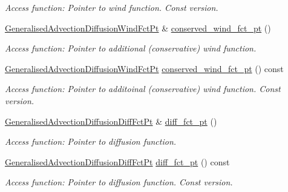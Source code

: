 \begin{DoxyCompactItemize}
\begin{DoxyCompactList}\small\item\em Access function\+: Pointer to wind function. Const version. \end{DoxyCompactList}\item 
\hyperlink{classoomph_1_1GeneralisedAdvectionDiffusionEquations_ac5a63eb03aee5957e7b14a4578423cfc}{Generalised\+Advection\+Diffusion\+Wind\+Fct\+Pt} \& \hyperlink{classoomph_1_1GeneralisedAdvectionDiffusionEquations_ad30d41db43db57884cac9a0223715b50}{conserved\+\_\+wind\+\_\+fct\+\_\+pt} ()
\begin{DoxyCompactList}\small\item\em Access function\+: Pointer to additional (conservative) wind function. \end{DoxyCompactList}\item 
\hyperlink{classoomph_1_1GeneralisedAdvectionDiffusionEquations_ac5a63eb03aee5957e7b14a4578423cfc}{Generalised\+Advection\+Diffusion\+Wind\+Fct\+Pt} \hyperlink{classoomph_1_1GeneralisedAdvectionDiffusionEquations_a94a89a5a56af79c7924af36e2adc0038}{conserved\+\_\+wind\+\_\+fct\+\_\+pt} () const
\begin{DoxyCompactList}\small\item\em Access function\+: Pointer to additoinal (conservative) wind function. Const version. \end{DoxyCompactList}\item 
\hyperlink{classoomph_1_1GeneralisedAdvectionDiffusionEquations_a637371a9eebc399023c6a652e8219263}{Generalised\+Advection\+Diffusion\+Diff\+Fct\+Pt} \& \hyperlink{classoomph_1_1GeneralisedAdvectionDiffusionEquations_aa0d22a83b060ea55524c198f7be2c73c}{diff\+\_\+fct\+\_\+pt} ()
\begin{DoxyCompactList}\small\item\em Access function\+: Pointer to diffusion function. \end{DoxyCompactList}\item 
\hyperlink{classoomph_1_1GeneralisedAdvectionDiffusionEquations_a637371a9eebc399023c6a652e8219263}{Generalised\+Advection\+Diffusion\+Diff\+Fct\+Pt} \hyperlink{classoomph_1_1GeneralisedAdvectionDiffusionEquations_a7e2bcd1880f2e58986c230aea5fa0e0a}{diff\+\_\+fct\+\_\+pt} () const
\begin{DoxyCompactList}\small\item\em Access function\+: Pointer to diffusion function. Const version. \end{DoxyCompactList}\item 

\end{DoxyCompactItemize}
